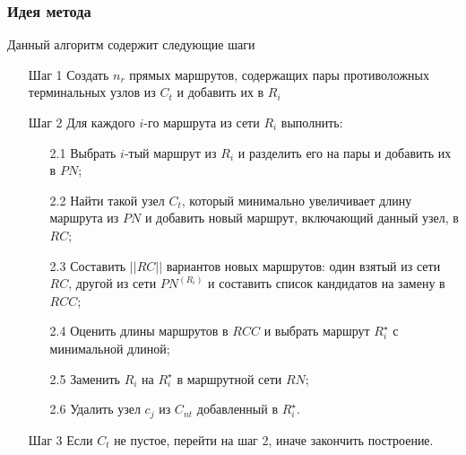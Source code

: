 \subsubsection{Идея метода}
Данный алгоритм содержит следующие шаги
\begin{enumerate}
    \item[Шаг 1] Создать \( n_r \) прямых маршрутов, содержащих пары противоложных терминальных 
        узлов из \( C_t \) и добавить их в \( R_i \)
    \item[Шаг 2] Для каждого \( i \)-го маршрута из сети \( R_i \) выполнить:
    \begin{enumerate}
        \item[2.1] Выбрать \( i \)-тый маршрут из \( R_i \) и разделить его на пары и добавить их в \( PN \);
        \item[2.2] Найти такой узел \( C_t \), который минимально увеличивает длину маршрута из \( PN \) и 
            добавить новый маршрут, включающий данный узел, в \( RC \);
        \item[2.3] Составить \( ||RC|| \) вариантов новых маршрутов: один взятый из сети \( RC \), другой 
            из сети \( PN^{(R_{i})} \) и составить список кандидатов на замену в \( RCC \);
        \item[2.4] Оценить длины маршрутов в \( RCC \) и выбрать маршрут \( R^{\star}_{i} \) 
            с минимальной длиной;
        \item[2.5] Заменить \( R_{i} \) на $R^{\star}_{i}$ в маршрутной сети \( RN \);
        \item[2.6] Удалить узел \( c_{j} \) из \( C_{nt} \) добавленный в \( R^{\star}_{i} \). 
    \end{enumerate}
    \item[Шаг 3] Если \( C_t \) не пустое, перейти на шаг 2, иначе закончить построение.
\end{enumerate}

